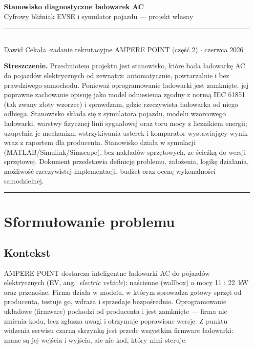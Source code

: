 \documentclass[11pt]{article}
\begin{document}
\begin{center}
{\sffamily\bfseries\color{navy}\LARGE Stanowisko diagnostyczne ładowarek AC}\\[4pt]
{\sffamily\large\color{navy} Cyfrowy bliźniak EVSE i symulator pojazdu --- projekt własny}\\[7pt]
{\color{rulegrey}\rule{0.85\linewidth}{1pt}}\\[5pt]
{\sffamily\small Dawid Cekała \quad$\cdot$\quad zadanie rekrutacyjne AMPERE POINT (część 2) \quad$\cdot$ czerwca 2026}
\end{center}

\vspace{0.4em}

\noindent\textbf{Streszczenie.} Przedmiotem projektu jest stanowisko, które bada ładowarkę AC do pojazdów elektrycznych od zewnątrz: automatycznie, powtarzalnie i bez prawdziwego samochodu. Ponieważ oprogramowanie ładowarki jest zamknięte, jej poprawne zachowanie opisuję jako model odniesienia zgodny z normą IEC 61851 (tak zwany złoty wzorzec) i sprawdzam, gdzie rzeczywista ładowarka od niego odbiega. Stanowisko składa się z symulatora pojazdu, modelu wzorcowego ładowarki, warstwy fizycznej linii sygnałowej oraz toru mocy z licznikiem energii; uzupełnia je mechanizm wstrzykiwania usterek i komparator wystawiający wynik wraz z raportem dla producenta. Stanowisko działa w symulacji (MATLAB/Simulink/Simscape), bez nakładów sprzętowych, ze ścieżką do wersji sprzętowej. Dokument przedstawia definicję problemu, założenia, logikę działania, możliwość rzeczywistej implementacji, budżet oraz ocenę wykonalności samodzielnej.

\vspace{0.2em}
{\color{rulegrey}\rule{\linewidth}{0.6pt}}

\tableofcontents
\newpage

\section{Sformułowanie problemu}

\subsection{Kontekst}

AMPERE POINT dostarcza inteligentne ładowarki AC do pojazdów elektrycznych (EV, ang.\ \textit{electric vehicle}): naścienne (wallbox) o mocy 11 i 22~kW oraz przenośne. Firma działa w modelu, w którym sprowadza gotowy sprzęt od producenta, testuje go, wdraża i sprzedaje bezpośrednio. Oprogramowanie układowe (firmware) pochodzi od producenta i jest zamknięte --- firma nie zmienia kodu, lecz zgłasza uwagi i otrzymuje poprawione wersje. Z punktu widzenia serwisu czarną skrzynką jest przede wszystkim firmware ładowarki: znane są jej wejścia i wyjścia, ale nie kod, który nimi steruje.
\end{document}
